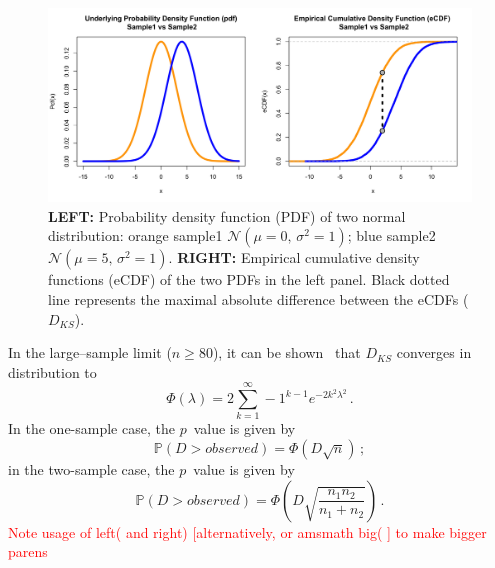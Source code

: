 \documentclass[codesnippet]{jss}
\newcommand{\RBnote}[1]{\textcolor{red}{#1}}
\begin{document}
\begin{figure}[t!]
\centering
\includegraphics{pdfvsCDF}
\caption{\label{fig:kstest1D} \textbf{LEFT:} Probability density function (PDF) of two normal distribution: orange sample1 $\mathcal{N}(\mu = 0,\,\sigma^{2} = 1)$; blue sample2 $\mathcal{N}(\mu = 5,\,\sigma^{2} = 1)$. \textbf{RIGHT:} Empirical cumulative density functions (eCDF) of the two PDFs in the left panel. Black dotted line represents the maximal absolute difference between the eCDFs ($D_{KS}$).
}
\end{figure}


In the large--sample limit ($n \geq 80$), it can be shown~\citep{Kendall1946} that $D_{KS}$ converges in distribution to
\begin{equation} \label{eq:1}
\Phi(\lambda) = 2 \sum_{k=1}^{\infty} -1^{k-1}e^{-2k^2\lambda^2} \,.
\end{equation}
%
In the one-sample case, the $p$~value is given by
\begin{equation} \label{eq:2}
\mathbb{P}(D > observed) = \Phi ( D\sqrt{n})\,;
\end{equation}
in the two-sample case, the $p$~value is given by
%
\begin{equation} \label{eq:3}
\mathbb{P}(D > observed) = \Phi \left( D\sqrt{\frac{n_1n_2}{n_1+n_2}} \right)\,.
\end{equation}
%
\RBnote{Note usage of left( and right) [alternatively, or amsmath big( ] to make bigger parens}
\end{document}
